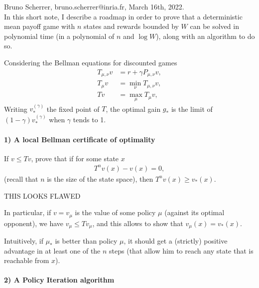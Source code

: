 \documentclass{article}
\begin{document}
Bruno Scherrer, bruno.scherrer@inria.fr, March 16th, 2022.
~\\

In this short note, I describe a roadmap in order to prove that a deterministic mean payoff game with $n$ states and rewards bounded by $W$ can be solved in polynomial time (in a polynomial of $n$ and $\log W$), along with an algorithm to do so.

Considering the Bellman equations for discounted games
\begin{align}
  T_{\mu,\nu}v &= r + \gamma P_{\mu,\nu}v, \\
  T_{\mu}v & = \min_\nu T_{\mu,\nu}v, \\
  T v &= \max_\mu T_{\mu}v,
\end{align}
Writing $v^{(\gamma)}_*$ the fixed point of $T$, the optimal gain $g_*$ is the limit of $(1-\gamma)v^{(\gamma)}_*$ when $\gamma$ tends to 1.

\paragraph{1) A local Bellman certificate of optimality}

If $v\le Tv$, prove that if for some state $x$
\begin{align}
  T^n v(x)-v(x)=0,
\end{align}
(recall that $n$ is the size of the state space), then $T^n v(x) \ge v_*(x)$.

THIS LOOKS FLAWED

In particular, if $v=v_\mu$ is the value of some policy $\mu$ (against its optimal opponent), we have $v_\mu \le T v_\mu$, and this allows to show that $v_\mu(x)=v_*(x)$.

Intuitively, if $\mu_*$ is better than policy $\mu$, it should get a (strictly) positive advantage in at least one of the $n$ steps (that allow him to reach any state that is reachable from $x$).

\paragraph{2) A Policy Iteration algorithm}
\end{document}
